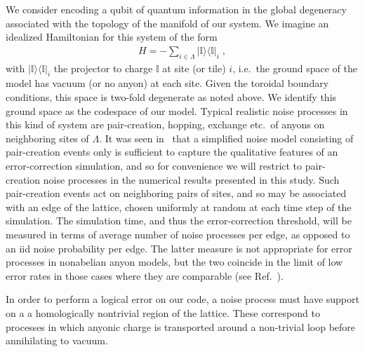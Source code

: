 \documentclass[aps, prl, letterpaper, twocolumn, superscriptaddress, notitlepage, 10pt]{revtex4-1}
\newcommand{\vac}{\mathbb{I}}
\newcommand{\ket}[1]{|{#1}\rangle}
\newcommand{\bra}[1]{\langle{#1}|}
\newcommand{\ketbra}[2]{\ket{#1}\!\bra{#2}}
\newcommand{\proj}[1]{\ketbra{#1}{#1}}
\begin{document}
We consider encoding a qubit of quantum information in the global degeneracy associated 
with the topology of the manifold of our system. We imagine an idealized Hamiltonian for this 
system of the form
\begin{align}
	H=-\sum_{i\in \Lambda}\proj{\vac}_i\;,\label{e:hamiltonian}
\end{align}
with $\proj{\vac}_i$ the projector to charge $\vac$ at site (or tile) $i$, i.e.~the ground 
space of the model has vacuum (or no anyon) at each site. Given the toroidal boundary 
conditions, this space is two-fold degenerate as noted above. We identify this ground space 
as the codespace of our model. Typical realistic noise processes in this kind of system are 
pair-creation, hopping, exchange etc.~of anyons on neighboring sites of $\Lambda$. It was 
seen in~\cite{Brell2013} that a simplified noise model consisting of pair-creation events only 
is sufficient to capture the qualitative features of an error-correction simulation, and so for convenience we 
will restrict to pair-creation noise processes in the numerical results presented in this study. 
Such pair-creation events act on neighboring pairs of sites,
and so may be associated with an edge of the lattice, chosen 
uniformly at random at each time step of the simulation. The simulation time, and thus the 
error-correction threshold, will be measured in terms of average number of noise processes 
per edge, as opposed to an iid noise probability per edge. The latter measure is not 
appropriate for error processes in nonabelian anyon models, but the two coincide in the limit 
of low error rates in those cases where they are comparable (see Ref.~\cite{Brell2013}).

In order to perform a logical error on our code, a noise process must have support on a 
a homologically nontrivial region of the lattice.
These correspond to processes in which anyonic charge is transported around a non-trivial loop before 
annihilating to vacuum.
\end{document}
